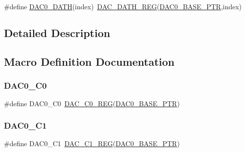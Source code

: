 \begin{DoxyCompactItemize}
\item 
\#define \hyperlink{group___d_a_c___register___accessor___macros_ga0c1025944a54ab896169911f32453cf1}{D\+A\+C0\+\_\+\+D\+A\+TH}(index)~\hyperlink{group___d_a_c___register___accessor___macros_ga53b85847dea8002316aa2880d5c27f68}{D\+A\+C\+\_\+\+D\+A\+T\+H\+\_\+\+R\+EG}(\hyperlink{group___d_a_c___peripheral_gabe3b30df06ec04e5c899efd6e49f1800}{D\+A\+C0\+\_\+\+B\+A\+S\+E\+\_\+\+P\+TR},index)
\end{DoxyCompactItemize}


\subsection{Detailed Description}


\subsection{Macro Definition Documentation}
\mbox{\label{group___d_a_c___register___accessor___macros_ga00e22b8e72b6f59cbb7c46c47c71930c}} 
\subsubsection{\texorpdfstring{D\+A\+C0\+\_\+\+C0}{DAC0\_C0}}
{\footnotesize\ttfamily \#define D\+A\+C0\+\_\+\+C0~\hyperlink{group___d_a_c___register___accessor___macros_ga535f8efe3924aa0e193dc9a57b4cae83}{D\+A\+C\+\_\+\+C0\+\_\+\+R\+EG}(\hyperlink{group___d_a_c___peripheral_gabe3b30df06ec04e5c899efd6e49f1800}{D\+A\+C0\+\_\+\+B\+A\+S\+E\+\_\+\+P\+TR})}

\mbox{\label{group___d_a_c___register___accessor___macros_ga54148f65bd470a8414d0de17427b3c50}} 
\subsubsection{\texorpdfstring{D\+A\+C0\+\_\+\+C1}{DAC0\_C1}}
{\footnotesize\ttfamily \#define D\+A\+C0\+\_\+\+C1~\hyperlink{group___d_a_c___register___accessor___macros_ga5177a56f528748e9c9e8138a130a289d}{D\+A\+C\+\_\+\+C1\+\_\+\+R\+EG}(\hyperlink{group___d_a_c___peripheral_gabe3b30df06ec04e5c899efd6e49f1800}{D\+A\+C0\+\_\+\+B\+A\+S\+E\+\_\+\+P\+TR})}

